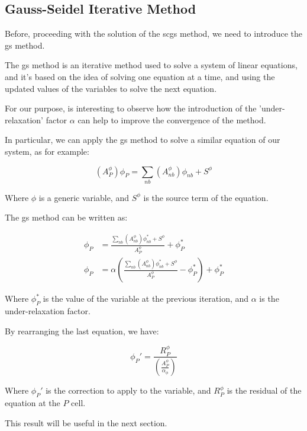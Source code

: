 \subsection{Gauss-Seidel Iterative Method}
\label{subsec:gauss_seidel_iterative_method}

Before, proceeding with the solution of the \acrshort{scgs} method, we need to introduce the \acrfull{gs} method.

The \acrshort{gs} method is an iterative method used to solve a system of linear equations, and it's based on the idea of solving one equation at a time, and using the updated values of the variables to solve the next equation.

For our purpose, is interesting to observe how the introduction of the 'under-relaxation' factor $\alpha$ can help to improve the convergence of the method.

In particular, we can apply the \acrshort{gs} method to solve a similar equation of our system, as for example:

\begin{equation}
    (A_P^\phi) \phi_P = \sum_{nb} (A_{nb}^\phi) \phi_{nb} + S^\phi
\end{equation}

Where $\phi$ is a generic variable, and $S^\phi$ is the source term of the equation.

The \acrshort{gs} method can be written as:

\begin{align}
    \phi_P & = \frac{\sum_{nb} (A_{nb}^\phi) \phi_{nb}^* + S^\phi}{A_P^\phi} + \phi_P^*                                \\
    \phi_P & = \alpha \left(\frac{\sum_{nb} (A_{nb}^\phi) \phi_{nb}^* + S^\phi}{A_P^\phi} - \phi_P^*\right) + \phi_P^*
\end{align}

Where $\phi_P^*$ is the value of the variable at the previous iteration, and $\alpha$ is the under-relaxation factor.

By rearranging the last equation, we have:

\begin{equation}
    \phi_P' = \frac{R_P^\phi}{\left(\frac{A_P^\phi}{\alpha_\phi}\right)}
\end{equation}

Where $\phi_P'$ is the correction to apply to the variable, and $R_P^\phi$ is the residual of the equation at the $P$ cell.

This result will be useful in the next section.
